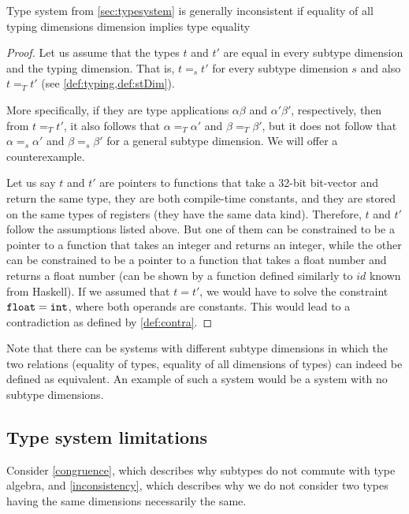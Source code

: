 \begin{lemma}Type system from \cref{sec:typesystem} is generally inconsistent if equality of all typing dimensions dimension implies type equality
    \label{inconsistency}
    \begin{proof}
        Let us assume that the types $t$ and $t'$ are equal in every subtype dimension and the typing dimension. That is, $t =_s t'$ for every subtype dimension $s$ and also $t =_T t'$ (see \cref{def:typing,def:stDim}).

        More specifically, if they are type applications $\alpha \beta$ and $\alpha' \beta'$, respectively, then from $t =_T t'$, it also follows that $\alpha =_T \alpha'$ and $\beta =_T \beta'$, but it does not follow that $\alpha =_s \alpha'$ and $\beta =_s \beta'$ for a general subtype dimension. We will offer a counterexample.

        Let us say $t$ and $t'$ are pointers to functions that take a 32-bit bit-vector and return the same type, they are both compile-time constants, and they are stored on the same types of registers (they have the same data kind). Therefore, $t$ and $t'$ follow the assumptions listed above. But one of them can be constrained to be a pointer to a function that takes an integer and returns an integer, while the other can be constrained to be a pointer to a function that takes a float number and returns a float number (can be shown by a function defined similarly to $id$ known from Haskell). If we assumed that $t = t'$, we would have to solve the constraint $\mathtt{float} = \mathtt{int}$, where both operands are constants. This would lead to a contradiction as defined by \cref{def:contra}.
    \end{proof}
\end{lemma}

Note that there can be systems with different subtype dimensions in which the two relations (equality of types, equality of all dimensions of types) can indeed be defined as equivalent. An example of such a system would be a system with no subtype dimensions.

\subsection{Type system limitations}
\label{sec:tsLims}

Consider \cref{congruence}, which describes why subtypes do not commute with type algebra, and \cref{inconsistency}, which describes why we do not consider two types having the same dimensions necessarily the same.

